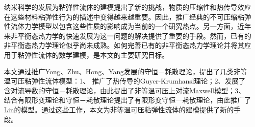 
\begin{cabstract}
纳米科学的发展为粘弹性流体的建模提出了新的挑战，物质的压缩性和热传导效应在这些材料粘弹性行为的描述中变得越来越重要。因此，推广经典的不可压缩粘弹性流体力学模型以包含这些性质的影响成为当前的一个研究热点。另一方面，近年来非平衡态热力学的快速发展为这一问题的解决提供了重要的手段。然而，已有的非平衡态热力学理论似乎尚未成熟。如何完善已有的非平衡态热力学理论并将其应用于粘弹性流体的数学建模，是本文的主要研究目标。



本文通过推广Yong、Zhu、Hong、Yang发展的守恒－耗散理论，提出了几类非等温可压粘弹性流体模型：1、 推广了热传导的Guyer-Krumhansl理论；2、发展了含对流导数的守恒－耗散理论，由此提出了非等温可压上对流Maxwell模型；3、结合有限形变理论和守恒－耗散理论提出了有限形变守恒—耗散理论，由此推广了Lin的模型。通过这些工作，本文为非等温可压粘弹性流体的建模提供了新的手段。




\end{cabstract}
